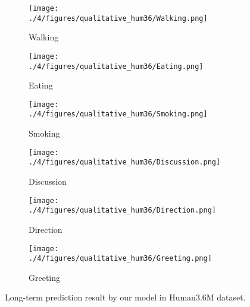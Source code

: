 \begin{figure}
     \centering
     \begin{subfigure}{0.45\textwidth}
         \centering
         \texttt{[image: ./4/figures/qualitative\_hum36/Walking.png]}
         \caption{Walking}
         \label{fig:3d_long_walking}
     \end{subfigure}
     \begin{subfigure}{0.45\textwidth}
         \centering
         \texttt{[image: ./4/figures/qualitative\_hum36/Eating.png]}
         \caption{Eating}
         \label{fig:3d_long_eating}
     \end{subfigure}
     
     \begin{subfigure}{0.45\textwidth}
         \centering
         \texttt{[image: ./4/figures/qualitative\_hum36/Smoking.png]}
         \caption{Smoking}
         \label{fig:3d_long_smoking}
     \end{subfigure}
     \begin{subfigure}{0.45\textwidth}
         \centering
         \texttt{[image: ./4/figures/qualitative\_hum36/Discussion.png]}
         \caption{Discussion}
         \label{fig:3d_long_discussion}
     \end{subfigure}

     \begin{subfigure}{0.45\textwidth}
         \centering
         \texttt{[image: ./4/figures/qualitative\_hum36/Direction.png]}
         \caption{Direction}
         \label{fig:3d_long_direction}
     \end{subfigure}
     \begin{subfigure}{0.45\textwidth}
         \centering
         \texttt{[image: ./4/figures/qualitative\_hum36/Greeting.png]}
         \caption{Greeting}
         \label{fig:3d_long_greeting}
     \end{subfigure}
    
     \caption{Long-term prediction result by our model in Human3.6M dataset.}
     \label{fig:3D_long_qual_1}
\end{figure}

